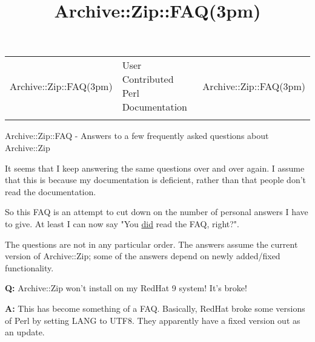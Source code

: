 \documentclass[]{article}
\title{Archive::Zip::FAQ(3pm)}
\author{}
\date{}
\let\realtextbf=\textbf
\renewcommand{\textbf}[1]{\textcolor{boldcolor}{\realtextbf{#1}}}
\renewcommand{\emph}[1]{\underline{#1}}
\begin{document}
\maketitle

\begin{longtable}[c]{@{}lll@{}}
\toprule\addlinespace
Archive::Zip::FAQ(3pm) & User Contributed Perl Documentation &
Archive::Zip::FAQ(3pm)
\\\addlinespace
\bottomrule
\end{longtable}


Archive::Zip::FAQ - Answers to a few frequently asked questions about
Archive::Zip


It seems that I keep answering the same questions over and over again. I
assume that this is because my documentation is deficient, rather than
that people don't read the documentation.

So this FAQ is an attempt to cut down on the number of personal answers
I have to give. At least I can now say "You \emph{did} read the FAQ,
right?".

The questions are not in any particular order. The answers assume the
current version of Archive::Zip; some of the answers depend on newly
added/fixed functionality.


\textbf{Q:} Archive::Zip won't install on my RedHat 9 system! It's
broke!

\textbf{A:} This has become something of a FAQ. Basically, RedHat broke
some versions of Perl by setting LANG to UTF8. They apparently have a
fixed version out as an update.
\end{document}
